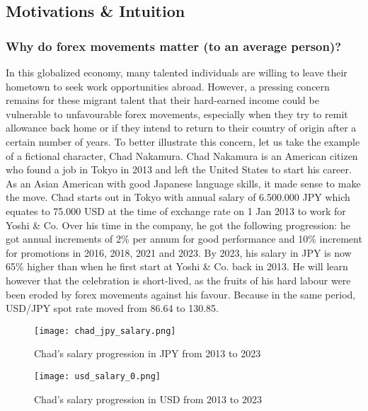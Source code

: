 \documentclass{article}
\begin{document}
\subsection{Motivations \& Intuition}
\subsubsection{Why do forex movements matter (to an average person)?}
In this globalized economy, many talented individuals are willing to leave their hometown to seek work opportunities abroad. However, a pressing concern remains for these migrant talent that their hard-earned income could be vulnerable to unfavourable forex movements, especially when they try to remit allowance back home or if they intend to return to their country of origin after a certain number of years.
\newline
\newline
\noindent To better illustrate this concern, let us take the example of a fictional character, Chad Nakamura. Chad Nakamura is an American citizen who found a job in Tokyo in 2013 and left the United States to start his career. As an Asian American with good Japanese language skills, it made sense to make the move.
\newline
\newline
\noindent Chad starts out in Tokyo with annual salary of 6.500.000 JPY which equates to 75.000 USD at the time of exchange rate on 1 Jan 2013 to work for Yoshi \& Co. Over his time in the company, he got the following progression: he got annual increments of 2\% per annum for good performance and 10\% increment for promotions in 2016, 2018, 2021 and 2023. By 2023, his salary in JPY is now 65\% higher than when he first start at Yoshi \& Co. back in 2013.
\newline
\newline
\noindent He will learn however that the celebration is short-lived, as the fruits of his hard labour were been eroded by forex movements against his favour. Because in the same period, USD/JPY spot rate moved from 86.64 to 130.85.
\newpage
\begin{figure}[h]
  \centering
  \texttt{[image: chad\_jpy\_salary.png]}
  \caption{Chad's salary progression in JPY from 2013 to 2023}
  \label{fig:chad_salary}
\end{figure}

\begin{figure}[h]
  \centering
  \texttt{[image: usd\_salary\_0.png]}
  \caption{Chad's salary progression in USD from 2013 to 2023}
  \label{fig:chad_salary}
\end{figure}
\end{document}
